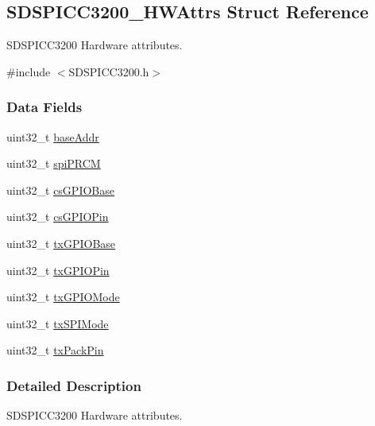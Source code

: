 \subsection{S\-D\-S\-P\-I\-C\-C3200\-\_\-\-H\-W\-Attrs Struct Reference}
\label{struct_s_d_s_p_i_c_c3200___h_w_attrs}


S\-D\-S\-P\-I\-C\-C3200 Hardware attributes.  




{\ttfamily \#include $<$S\-D\-S\-P\-I\-C\-C3200.\-h$>$}

\subsubsection*{Data Fields}
\begin{DoxyCompactItemize}
\item 
uint32\-\_\-t \hyperlink{struct_s_d_s_p_i_c_c3200___h_w_attrs_ab719c737801cacc1be5f4d3551553fa4}{base\-Addr}
\item 
uint32\-\_\-t \hyperlink{struct_s_d_s_p_i_c_c3200___h_w_attrs_a5018400a617d0bbdcfcb1fc1361389a8}{spi\-P\-R\-C\-M}
\item 
uint32\-\_\-t \hyperlink{struct_s_d_s_p_i_c_c3200___h_w_attrs_a3e9b0ffd41aa203b0ff23af0e83670e3}{cs\-G\-P\-I\-O\-Base}
\item 
uint32\-\_\-t \hyperlink{struct_s_d_s_p_i_c_c3200___h_w_attrs_a5adaae558104d9339719441e995661f0}{cs\-G\-P\-I\-O\-Pin}
\item 
uint32\-\_\-t \hyperlink{struct_s_d_s_p_i_c_c3200___h_w_attrs_a74e44f74a230a8b73709be421469aaaa}{tx\-G\-P\-I\-O\-Base}
\item 
uint32\-\_\-t \hyperlink{struct_s_d_s_p_i_c_c3200___h_w_attrs_a9428fc65d7331abeedad003fbd53d662}{tx\-G\-P\-I\-O\-Pin}
\item 
uint32\-\_\-t \hyperlink{struct_s_d_s_p_i_c_c3200___h_w_attrs_a6bcfd4de926b3be4315087cf536f8b1b}{tx\-G\-P\-I\-O\-Mode}
\item 
uint32\-\_\-t \hyperlink{struct_s_d_s_p_i_c_c3200___h_w_attrs_a3790f0017a294cda85b96db7e0c0cded}{tx\-S\-P\-I\-Mode}
\item 
uint32\-\_\-t \hyperlink{struct_s_d_s_p_i_c_c3200___h_w_attrs_ac74ef997109f15ab77d18fac98bbf939}{tx\-Pack\-Pin}
\end{DoxyCompactItemize}


\subsubsection{Detailed Description}
S\-D\-S\-P\-I\-C\-C3200 Hardware attributes. 

